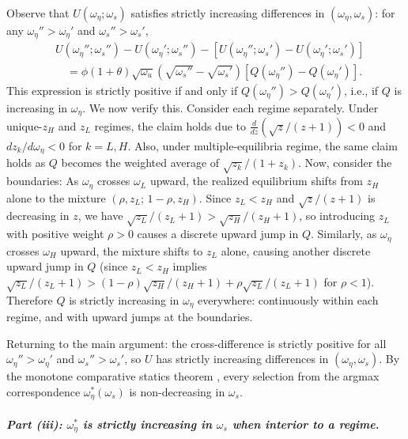     Observe that $U(\omega_\eta;\omega_s)$ satisfies strictly increasing differences in $(\omega_\eta, \omega_s)$: for any $\omega_\eta'' > \omega_\eta'$ and $\omega_s'' > \omega_s'$,
    \begin{align*}
    &U(\omega_\eta'';\omega_s'') - U(\omega_\eta';\omega_s'')
    - \left[U(\omega_\eta'';\omega_s') - U(\omega_\eta';\omega_s')\right]\\
    &\quad= \phi(1+\theta)\sqrt{\omega_u}
    \left(\sqrt{\omega_s''}-\sqrt{\omega_s'}\right)
    \left[Q(\omega_\eta'') - Q(\omega_\eta')\right].
    \end{align*}
    This expression is strictly positive if and only if $Q(\omega_\eta'') > Q(\omega_\eta')$, i.e., if $Q$ is increasing in $\omega_\eta$. We now verify this.
    Consider each regime separately. Under unique-$z_H$ and $z_L$ regimes, the claim holds due to  $\frac{d}{dz}(\sqrt{z}/(z+1)) < 0$ and $dz_k/d\omega_\eta < 0$ for $k=L,H$. Also, under multiple-equilibria regime, the same claim holds as $Q$ becomes the weighted average of $\sqrt{z_k}/(1+z_k)$. Now, consider the boundaries: As $\omega_\eta$ crosses $\omega_L$ upward, the realized equilibrium shifts from $z_H$ alone to the mixture $(\rho, z_L;\, 1-\rho, z_H)$. Since $z_L < z_H$ and $\sqrt{z}/(z+1)$ is decreasing in $z$, we have $\sqrt{z_L}/(z_L+1) > \sqrt{z_H}/(z_H+1)$, so introducing $z_L$ with positive weight $\rho > 0$ causes a discrete upward jump in $Q$. Similarly, as $\omega_\eta$ crosses $\omega_H$ upward, the mixture shifts to $z_L$ alone, causing another discrete upward jump in $Q$ (since $z_L < z_H$ implies $\sqrt{z_L}/(z_L+1) > (1-\rho)\sqrt{z_H}/(z_H+1) + \rho\sqrt{z_L}/(z_L+1)$ for $\rho < 1$).
    Therefore $Q$ is strictly increasing in $\omega_\eta$ everywhere: continuously within each regime, and with upward jumps at the boundaries.
    
    Returning to the main argument: the cross-difference is strictly positive for all $\omega_\eta'' > \omega_\eta'$ and $\omega_s'' > \omega_s'$, so $U$ has strictly increasing differences in $(\omega_\eta, \omega_s)$. By the monotone comparative statics theorem \citep{topkis1998}, every selection from the argmax correspondence $\omega_\eta^*(\omega_s)$ is non-decreasing in $\omega_s$.
    
    \paragraph{\textit{\textmd{Part (iii): $\omega_\eta^*$ is strictly increasing in $\omega_s$ when interior to a regime.}}}
    
